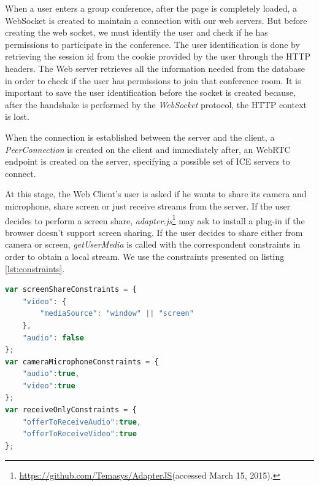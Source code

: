 When a user enters a group conference, after the page is completely loaded, a WebSocket is created to maintain a connection with our web servers. 
But before creating the web socket, we must identify the user and check if he has permissions to participate in the conference. The user identification is done by retrieving the session id from the cookie provided by the user through the \ac{HTTP} headers.
The Web server retrieves all the information needed from the database in order to check if the user has permissions to join that conference room. It is important to save the user identification before the socket is created because, after the handshake is performed by the \emph{WebSocket} protocol\cite{rfc6455}, the \ac{HTTP} context is lost.

When the connection is established between the server and the client, a \emph{PeerConnection} is created on the client and immediately after, an \ac{WebRTC} endpoint is created on the server, specifying a possible set of \ac{ICE} servers to connect.

At this stage, the Web Client's user is asked if he wants to share its camera and microphone, share screen or just receive streams from the server. If the user decides to perform a screen share, \emph{adapter.js}\footnote{\url{https://github.com/Temasys/AdapterJS}(accessed March 15, 2015).} may ask to install a plug-in if the browser doesn't support screen sharing.
If the user decides to share either from camera or screen, \emph{getUserMedia} is called with the correspondent constraints in order to obtain a local stream. We use the constraints presented on listing \ref{lst:constraints}. 

\begin{minipage}{\linewidth}
\begin{lstlisting}[caption={Media constraints},label={lst:constraints},language=JavaScript]
var screenShareConstraints = {	
	"video": {
		"mediaSource": "window" || "screen"
	}, 
	"audio": false
};
var cameraMicrophoneConstraints = {
	"audio":true, 
	"video":true 
};
var receiveOnlyConstraints = {
	"offerToReceiveAudio":true,
	"offerToReceiveVideo":true
};
\end{lstlisting}
\end{minipage}

